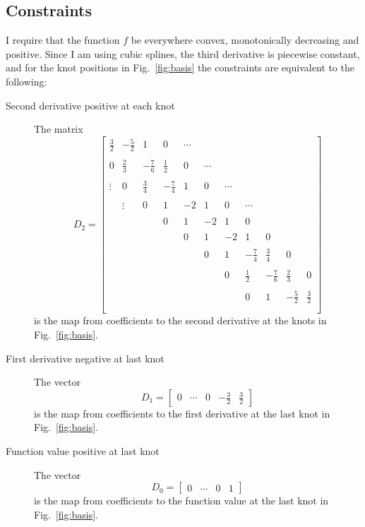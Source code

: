 \documentclass[11pt]{article}
\begin{document}
\subsection{Constraints}
\label{sec:constraints}

I require that the function $f$ be everywhere convex, monotonically
decreasing and positive.  Since I am using cubic splines, the third
derivative is piecewise constant, and for the knot positions in
Fig.~\ref{fig:basis} the constraints are equivalent to the following:
\begin{description}
\item[Second derivative positive at each knot] The matrix
  \setcounter{MaxMatrixCols}{12}
  \begin{equation}
    \label{eq:d2}
    D_2 =
    \begin{bmatrix}
      \frac{3}{2} & -\frac{5}{2} & 1     & 0   & \cdots \\ \\
      0   & \frac{2}{3} & -\frac{7}{6} & \frac{1}{2} & 0 & \cdots \\ \\
      \vdots   & 0    & \frac{3}{4} & -\frac{7}{4} & 1 & 0 & \cdots \\ \\
      & \vdots    & 0   & 1 & -2 & 1 & 0 & \cdots \\ \\
       & & & 0 & 1 & -2 & 1 & 0  \\ \\
      & & & & 0 & 1 & -2 & 1 & 0  \\ \\
      &&&&& 0 & 1 & -\frac{7}{4} &\frac{3}{4} & 0 \\ \\
      &&&&&& 0 & \frac{1}{2} & -\frac{7}{6} & \frac{2}{3} & 0 \\ \\
      &&&&&&& 0 & 1 & -\frac{5}{2} & \frac{3}{2} \\ \\
    \end{bmatrix}
  \end{equation}
  is the map from coefficients to the second derivative at the knots
  in Fig.~\ref{fig:basis}.
\item[First derivative negative at last knot] The vector
  \begin{equation*}
    D_1 = \begin{bmatrix}
    0 & \cdots & 0 & -\frac{3}{2} & \frac{3}{2}
  \end{bmatrix}
  \end{equation*}
  is the map from coefficients to the first derivative at the last knot
  in Fig.~\ref{fig:basis}.
\item[Function value positive at last knot] The vector
  \begin{equation*}
     D_0 = \begin{bmatrix}
    0 & \cdots & 0 & 1
  \end{bmatrix}
  \end{equation*}
  is the map from coefficients to the function value at the last knot
  in Fig.~\ref{fig:basis}.
\end{description}
\end{document}
